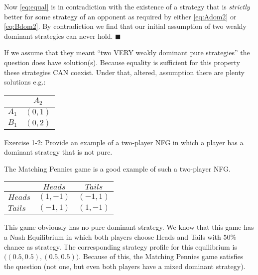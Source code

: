 \documentclass[../main.tex]{subfiles}
\begin{document}
\begin{solution}
	Now \autoref{eq:equal} is in contradiction with the existence of a strategy that is \emph{strictly} better for some strategy of an opponent as required by either \autoref{eq:Adom2} or \autoref{eq:Bdom2}.
	By contradiction we find that our initial assumption of two weakly dominant strategies can never hold. $\blacksquare$

	If we assume that they meant ``two VERY weakly dominant pure strategies'' the question does have solution(s). Because equality is sufficient for this property these strategies CAN coexist.
	Under that, altered, assumption there are plenty solutions e.g.: 
        \begin{center}
    	    \begin{tabular}{|l|c|}
    	    \hline
    	    & $A_2$ \\
    	    \hline
			$A_1$ & $(0,1)$\\
    	    \hline
    	    $B_1$ & $(0,2)$\\
    	    \hline
    	    \end{tabular}
        \end{center}
\end{solution}

\begin{question}
Exercise 1-2: Provide an example of a two-player NFG in which a player has a dominant strategy that is not pure.
\end{question}

\begin{solution}
The Matching Pennies game is a good example of such a two-player NFG.
        \begin{center}
    	    \begin{tabular}{|l|c|c|}
    	    \hline
    	    & $Heads$ & $Tails$ \\
    	    \hline
    	    $Heads$ & $(1,-1)$ & $(-1,1)$ \\
    	    \hline
    	    $Tails$ & $(-1,1)$ & $(1,-1)$ \\
    	    \hline
    	    \end{tabular}
        \end{center}
This game obviously has no pure dominant strategy.
We know that this game has a Nash Equilibrium in which both players choose Heads and Tails with 50\% chance as strategy.
The corresponding strategy profile for this equilibrium is $\big((0.5,0.5), (0.5,0.5)\big)$.
Because of this, the Matching Pennies game satisfies the question (not one, but even both players have a mixed dominant strategy).
\end{solution}
\end{document}
